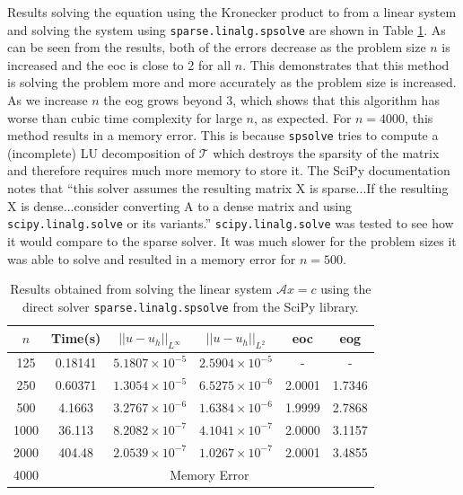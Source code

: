 \documentclass[11pt]{article}
\numberwithin{equation}{section}
\begin{document}
Results solving the equation using the Kronecker product to from a linear system and solving the system using \texttt{sparse.linalg.spsolve} are shown in Table \ref{table:kron direct}. As can be seen from the results, both of the errors decrease as the problem size $n$ is increased and the eoc is close to 2 for all $n$. This demonstrates that this method is solving the problem more and more accurately as the problem size is increased. As we increase $n$ the eog grows beyond $3$, which shows that this algorithm has worse than cubic time complexity for large $n$, as expected. For $n=4000$, this method results in a memory error. This is because \texttt{spsolve} tries to compute a (incomplete) LU decomposition of $\mathcal{T}$ which destroys the sparsity of the matrix and therefore requires much more memory to store it. The SciPy documentation notes that ``this solver assumes the resulting matrix X is sparse...If the resulting X is dense...consider converting A to a dense matrix and using \texttt{scipy.linalg.solve} or its variants.'' \texttt{scipy.linalg.solve} was tested to see how it would compare to the sparse solver. It was much slower for the problem sizes it was able to solve and resulted in a memory error for $n=500$.

\begin{table}[H]
\centering
\begin{tabular}{|c|c|c|c|c|c|}
\hline
$n$ & Time(s) & $|| u - u_h ||_{L^{\infty}}$ &$|| u - u_h ||_{L^{2}}$ & eoc & eog \\
\hline
125 & 0.18141 & $5.1807 \times 10^{-5}$ & $2.5904 \times 10^{-5}$ & - & - \\
250 & 0.60371 & $1.3054 \times 10^{-5}$ & $6.5275 \times 10^{-6}$ & 2.0001 & 1.7346 \\
500 & 4.1663 & $3.2767 \times 10^{-6}$ & $1.6384 \times 10^{-6}$ & 1.9999 & 2.7868 \\
1000 & 36.113 & $8.2082 \times 10^{-7}$ & $4.1041 \times 10^{-7}$ & 2.0000 & 3.1157 \\
2000 & 404.48 & $2.0539 \times 10^{-7}$ & $1.0267 \times 10^{-7}$ & 2.0001 & 3.4855 \\
\cline{2-6}
4000 & \multicolumn{5}{c|}{Memory Error} \\
\hline
\end{tabular}
\captionsetup{justification=centering}
\caption{Results obtained from solving the linear system $\mathcal{A} x = c$ using the direct solver  \texttt{sparse.linalg.spsolve} from the SciPy library.}
\label{table:kron direct}
\end{table}
\end{document}
